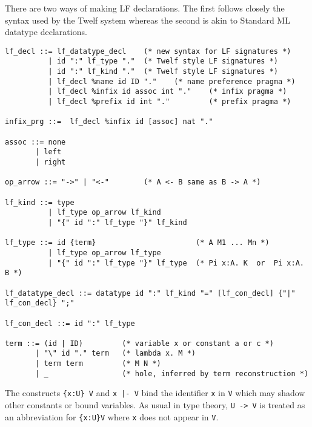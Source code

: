 \documentclass[11pt]{article}
\begin{document}
There are two ways of making LF declarations. The first follows closely the syntax used by the Twelf system whereas the second is akin to Standard ML datatype declarations.

\begin{verbatim}
lf_decl ::= lf_datatype_decl    (* new syntax for LF signatures *)
          | id ":" lf_type "."  (* Twelf style LF signatures *)
          | id ":" lf_kind "."  (* Twelf style LF signatures *)
          | lf_decl %name id ID "."    (* name preference pragma *)
          | lf_decl %infix id assoc int "."    (* infix pragma *)
          | lf_decl %prefix id int "."         (* prefix pragma *)

infix_prg ::=  lf_decl %infix id [assoc] nat "."

assoc ::= none
	   | left
	   | right 

op_arrow ::= "->" | "<-"        (* A <- B same as B -> A *)

lf_kind ::= type
          | lf_type op_arrow lf_kind
          | "{" id ":" lf_type "}" lf_kind

lf_type ::= id {term}                       (* A M1 ... Mn *)
          | lf_type op_arrow lf_type
          | "{" id ":" lf_type "}" lf_type  (* Pi x:A. K  or  Pi x:A. B *)

lf_datatype_decl ::= datatype id ":" lf_kind "=" [lf_con_decl] {"|" lf_con_decl} ";"

lf_con_decl ::= id ":" lf_type

term ::= (id | ID)         (* variable x or constant a or c *)
       | "\" id "." term   (* lambda x. M *)
       | term term         (* M N *)
       | _                 (* hole, inferred by term reconstruction *)
\end{verbatim}
The constructs \texttt{\{x:U\} V} and \texttt{x |- V} bind the identifier \texttt{x} in \texttt{V} which may shadow other constants or bound variables. As usual in type theory, \texttt{U -> V} is treated as an abbreviation for \texttt{\{x:U\}V} where \texttt{x} does not appear in \texttt{V}.
\end{document}
